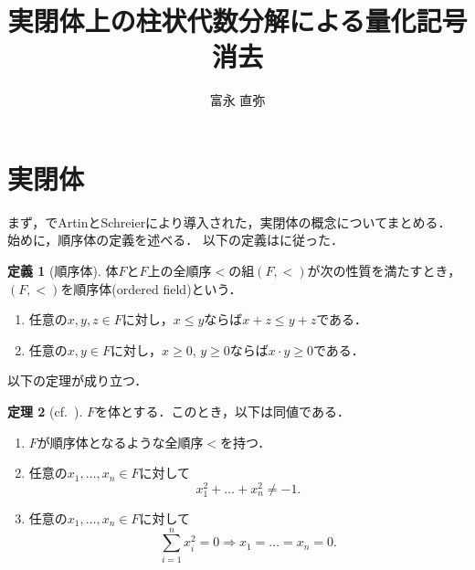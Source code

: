 \documentclass[uplatex, dvipdfmx]{jsarticle}
\numberwithin{equation}{section}
\theoremstyle{definition}
\newtheorem{definition}{定義}[section]
\newtheorem{theorem}[definition]{定理}
\begin{document}
\title{実閉体上の柱状代数分解による量化記号消去}
\author{富永 直弥}
\maketitle


\section{実閉体}

まず，\cite{MR3069467}でArtinとSchreierにより導入された，実閉体の概念についてまとめる．
始めに，順序体の定義を述べる．
以下の定義は\cite[Definition 1.1.1.]{MR1659509}に従った．

\begin{definition}[順序体]
     体$F$と$F$上の全順序$<$の組$(F,<)$が次の性質を満たすとき，$(F,<)$を順序体(ordered field)という．
     \begin{enumerate}
          \item 任意の$x,y,z\in F$に対し，$x \leq y$ならば$x + z \leq y + z$である．
          \item 任意の$x,y \in F$に対し，$x \geq 0$, $y \geq 0$ならば$x \cdot y \geq 0$である．
     \end{enumerate}
\end{definition}

以下の定理が成り立つ．

\begin{theorem}[{cf.~\cite[Theorem 1.1.8.]{MR1659509}}]\label{theorem:real-field}
     $F$を体とする．このとき，以下は同値である．
     \begin{enumerate}
          \item \label{theorem:real-field-1}
          $F$が順序体となるような全順序$<$を持つ．
          \item \label{theorem:real-field-2}
          任意の$x_1, \dots, x_n \in F$に対して
          \begin{equation}
               x_1^2 + \dots + x_n^2 \neq -1.
          \end{equation}
          \item \label{theorem:real-field-3}
          任意の$x_1, \dots, x_n \in F$に対して
          \begin{equation}
               \sum_{i=1}^n x_i^2 = 0 \Rightarrow x_1 = \dots = x_n = 0.
          \end{equation}
     \end{enumerate}
\end{theorem}
\end{document}
